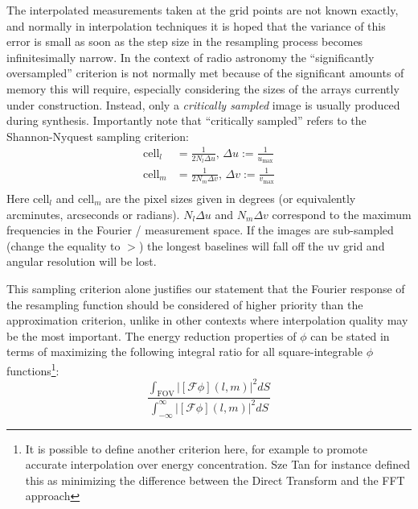  The interpolated measurements taken at the grid points are not known exactly, and normally in interpolation techniques it is 
 hoped that the variance of this error is small as soon as the step size in the resampling process becomes infinitesimally narrow. 
 In the context of radio astronomy the ``significantly oversampled'' criterion is not normally met because of the significant amounts 
 of memory this will require, especially considering the sizes of the arrays currently under construction. Instead, only a 
 \emph{critically sampled} image is usually produced during synthesis. Importantly note that ``critically sampled'' refers to 
 the Shannon-Nyquest sampling criterion:
 \begin{equation}
  \label{eqn_img_sampling}
  \begin{split}
    \text{cell}_l &= \frac{1}{2N_l\Delta{u}}\text{, }\Delta{u}:=\frac{1}{u_{\text{max}}}\\
    \text{cell}_m &= \frac{1}{2N_m\Delta{v}}\text{, }\Delta{v}:=\frac{1}{v_{\text{max}}}\\
  \end{split}
 \end{equation}
 Here $\text{cell}_l$ and $\text{cell}_m$ are the pixel sizes given in degrees (or equivalently arcminutes, arcseconds or radians). $N_l\Delta{u}$ and
 $N_m\Delta{v}$ correspond to the maximum frequencies in the Fourier / measurement space. If the images are 
 sub-sampled (change the equality to $>$) the longest baselines will fall off the uv grid and angular resolution will be lost. 
 
 This sampling criterion alone justifies our statement that the Fourier response of the resampling function should be considered of higher priority
 than the approximation criterion, unlike in other contexts where interpolation quality may be the most important. The energy reduction properties of
 $\phi$ can be stated in terms of maximizing the following integral ratio for all square-integrable $\phi$ functions\footnote{It is possible to
 define another criterion here, for example to promote accurate interpolation over energy concentration. Sze Tan \cite{tan1986aperture} for 
 instance defined this as minimizing the difference between the Direct Transform and the FFT approach}:
 \begin{equation}
  \label{eqn_aliasing_energy}
  \frac{\int_{\text{FOV}}{|[\mathcal{F}\phi](l,m)|^2dS}}{\int_{-\infty}^{\infty}{|[\mathcal{F}\phi](l,m)|^2dS}}
 \end{equation}
 
